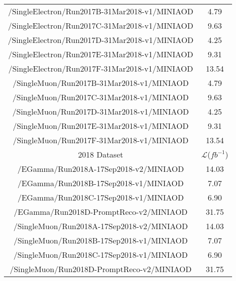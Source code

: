 \begin{table}
\begin{tabular}{cc}
        \hline 
        /SingleElectron/Run2017B-31Mar2018-v1/MINIAOD       & 4.79 \\
        /SingleElectron/Run2017C-31Mar2018-v1/MINIAOD       & 9.63 \\
        /SingleElectron/Run2017D-31Mar2018-v1/MINIAOD       & 4.25 \\
        /SingleElectron/Run2017E-31Mar2018-v1/MINIAOD       & 9.31 \\
        /SingleElectron/Run2017F-31Mar2018-v1/MINIAOD       & 13.54 \\
        \hline
        /SingleMuon/Run2017B-31Mar2018-v1/MINIAOD           & 4.79 \\
        /SingleMuon/Run2017C-31Mar2018-v1/MINIAOD           & 9.63 \\
        /SingleMuon/Run2017D-31Mar2018-v1/MINIAOD           & 4.25 \\
        /SingleMuon/Run2017E-31Mar2018-v1/MINIAOD           & 9.31 \\
        /SingleMuon/Run2017F-31Mar2018-v1/MINIAOD           & 13.54 \\
        \hline
        2018 Dataset & $\mathcal{L}$($fb^{-1}$) \\
        \hline 
        /EGamma/Run2018A-17Sep2018-v2/MINIAOD               & 14.03 \\
        /EGamma/Run2018B-17Sep2018-v1/MINIAOD               & 7.07 \\
        /EGamma/Run2018C-17Sep2018-v1/MINIAOD               & 6.90 \\
        /EGamma/Run2018D-PromptReco-v2/MINIAOD              & 31.75 \\
        \hline
        /SingleMuon/Run2018A-17Sep2018-v2/MINIAOD           & 14.03 \\
        /SingleMuon/Run2018B-17Sep2018-v1/MINIAOD           & 7.07 \\
        /SingleMuon/Run2018C-17Sep2018-v1/MINIAOD           & 6.90 \\
        /SingleMuon/Run2018D-PromptReco-v2/MINIAOD          & 31.75 \\
        \hline
    \end{tabular}
\end{table}

